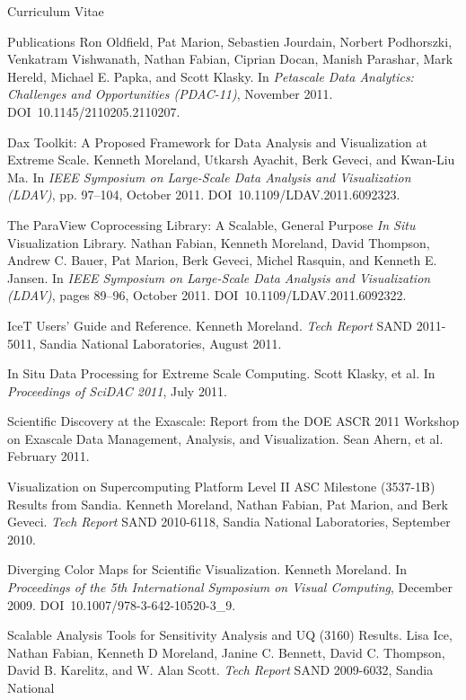 \documentclass{article}
\begin{document}
\begin{cv}{Curriculum Vitae}
\begin{cvlist}{Publications}
      Ron Oldfield, Pat Marion, Sebastien Jourdain, Norbert Podhorszki,
      Venkatram Vishwanath, Nathan Fabian, Ciprian Docan, Manish Parashar,
      Mark Hereld, Michael E. Papka, and Scott Klasky. In \emph{Petascale
        Data Analytics: Challenges and Opportunities (PDAC-11)}, November
      2011. DOI~10.1145/2110205.2110207.
    \item[Dax Toolkit: A Proposed Framework for Data Analysis and
      Visualization at] Extreme Scale. Kenneth Moreland, Utkarsh Ayachit,
      Berk Geveci, and Kwan-Liu Ma. In \emph{IEEE Symposium on Large-Scale
        Data Analysis and Visualization (LDAV)}, pp. 97--104, October
      2011. DOI~10.1109/LDAV.2011.6092323.
    \item[The ParaView Coprocessing Library: A Scalable, General Purpose
      \emph{In Situ}] Visualization Library. Nathan Fabian, Kenneth
      Moreland, David Thompson, Andrew C. Bauer, Pat Marion, Berk Geveci,
      Michel Rasquin, and Kenneth E. Jansen. In \emph{IEEE Symposium on
        Large-Scale Data Analysis and Visualization (LDAV)}, pages 89--96,
      October 2011. DOI~10.1109/LDAV.2011.6092322.
    \item[IceT Users' Guide and Reference.] Kenneth Moreland. \emph{Tech
      Report} SAND 2011-5011, Sandia National Laboratories, August 2011.
    \item[In Situ Data Processing for Extreme Scale Computing.] Scott
      Klasky, et al. In \emph{Proceedings of SciDAC 2011}, July 2011.
    \item[Scientific Discovery at the Exascale: Report from the DOE ASCR
      2011] Workshop on Exascale Data Management, Analysis, and
      Visualization. Sean Ahern, et al. February 2011.
    \item[Visualization on Supercomputing Platform Level II ASC Milestone]
      (3537-1B) Results from Sandia. Kenneth Moreland, Nathan Fabian, Pat
      Marion, and Berk Geveci. \emph{Tech Report} SAND 2010-6118, Sandia
      National Laboratories, September 2010.
    \item[Diverging Color Maps for Scientific Visualization.] Kenneth
      Moreland. In \emph{Proceedings of the 5th International Symposium on
        Visual Computing}, December 2009. DOI~10.1007/978-3-642-10520-3\_9.
    \item[Scalable Analysis Tools for Sensitivity Analysis and UQ (3160)
      Results.] Lisa Ice, Nathan Fabian, Kenneth D Moreland, Janine
      C. Bennett, David C. Thompson, David B. Karelitz, and W. Alan
      Scott. \emph{Tech Report} SAND 2009-6032, Sandia National

\end{cvlist}
\end{cv}
\end{document}
